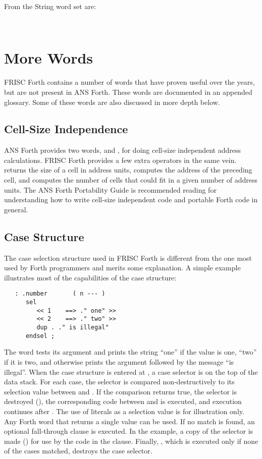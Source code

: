 From the String word set are:
\begin{center}
\ \ \ 
\end{center}

\section{More Words}
FRISC Forth contains a number of words that have proven useful over
the years, but are not present in ANS Forth.
These words are documented
in an appended glossary.  Some of these words are also discussed in more
depth below.

\subsection{Cell-Size Independence}
ANS Forth provides two words,  and , for doing
cell-size independent address calculations.  FRISC Forth provides
a few extra operators in the same vein.   returns the size
of a cell in address units,  computes the address of the
preceding cell, and  computes the number of cells
that could fit in a given number of address units.  The ANS Forth
Portability Guide is recommended reading for understanding how
to write cell-size independent code and portable Forth code in
general.

\subsection{Case Structure}
The case selection structure used in FRISC Forth is different from
the one most used by Forth programmers and merits some
explanation.  A simple example illustrates most of the capabilities of
the case structure:
\begin{verbatim}
   : .number       ( n --- )
      sel
         << 1    ==> ." one" >>
         << 2    ==> ." two" >>
         dup . ." is illegal"
      endsel ;
\end{verbatim}
The word  tests its argument and prints the string ``one''
if the value is one, ``two'' if it is two, and otherwise prints the
argument followed by the message ``is illegal''.  When the case
structure is entered at , a case selector is on the top of the
data stack.  For each case, the selector is compared
non-destructively to its selection value between \fw{$<<$} and
\fw{==$>$}.  If the comparison returns true, the selector is destroyed
(), the corresponding code between \fw{==$>$} and \fw{$>>$}
is executed, and execution continues after .  The use of
literals as a selection value is for illustration only.  Any Forth word
that returns a single value can be used.  If no match is found, an
optional fall-through clause is executed.  In the example, a
copy of the selector is made () for use by the code
in the clause.
Finally, , which is executed only if none of the cases
matched, destroys the case selector.

